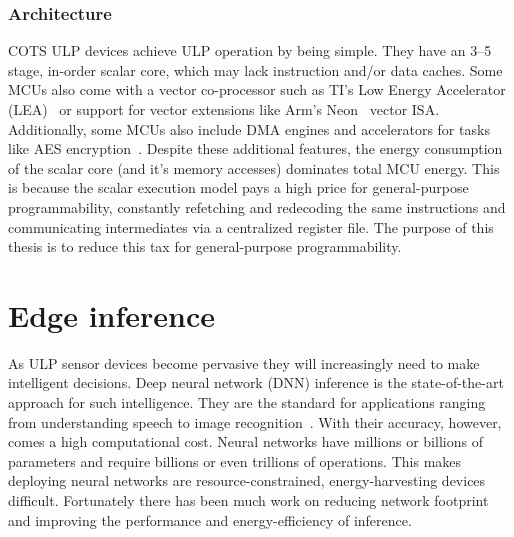 \subsubsection{Architecture}
COTS ULP devices achieve ULP operation by being simple.
% 
They have an 3--5 stage, in-order scalar core, which may lack instruction and/or data caches.
% 
Some MCUs also come with a vector co-processor such as TI's Low Energy Accelerator (LEA)~\cite{lea} or support for vector extensions like Arm's Neon~\cite{neon} vector ISA.
% 
Additionally, some MCUs also include DMA engines and accelerators for tasks like AES encryption~\cite{msp430fr5994}.
% 
Despite these additional features, the energy consumption of the scalar core (and it's memory accesses) dominates total MCU energy.
% 
This is because the scalar execution model pays a high price for general-purpose programmability, constantly refetching and redecoding the same instructions and communicating intermediates via a centralized register file.
% 
The purpose of this thesis is to reduce this tax for general-purpose programmability.

\section{Edge inference}
As ULP sensor devices become pervasive they will increasingly need to make intelligent decisions.
% 
Deep neural network (DNN) inference is the state-of-the-art approach for such intelligence.
% 
They are the standard for applications ranging from understanding speech to image recognition~\cite{alexnet,vgg, googlenet}.
% 
With their accuracy, however, comes a high computational cost.
% 
Neural networks have millions or billions of parameters and require billions or even trillions of operations.
% 
This makes deploying neural networks are resource-constrained, energy-harvesting devices difficult.
% 
Fortunately there has been much work on reducing network footprint and improving the performance and energy-efficiency of inference.
% 

